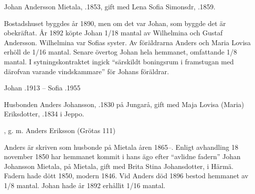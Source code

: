 Johan Andersson Mietala, .1853, gift med Lena Sofia Simonsdr, .1859.
\begin{jhchildren}
  \item {}
  \item {}
  \item {}
  \item {}
  \item {}
  \item {}
  \item {}
  \item {}
\end{jhchildren}
Bostadshuset byggdes år 1890, men om det var Johan, som byggde det är obekräftat. År 1892 köpte Johan 1/18 mantal av Wilhelmina och Gustaf Andersson. Wilhelmina var Sofias syster. Av föräldrarna Anders och Maria Lovisa erhöll de 1/16 mantal. Senare övertog Johan hela hemmanet, omfattande 1/8 mantal. I sytningskontraktet ingick ``särskildt boningsrum i framstugan med därofvan varande vindskammare'' för Johans föräldrar.

Johan .1913  --  Sofia .1955


Husbonden Anders Johansson,  .1830 på Jungarå, gift med Maja Lovisa (Maria) Eriksdotter, .1834 i Jeppo.
\begin{jhchildren}
  \item {}
  \item {}
  \item {}
  \item {}
  \item {}
  \item {}, g. m. Anders Eriksson (Grötas 111)
  \item {}
\end{jhchildren}
Anders är skriven som husbonde på Mietala åren 1865--. Enligt avhandling 18 november 1850 har hemmanet kommit i hans ägo efter	``avlidne fadern'' Johan Johansson Mietala,  på Mietala, gift med Brita Stina Johansdotter,  i Härmä. Fadern hade dött 1850, modern 1846.	Vid Anders död 1896 bestod hemmanet av 1/8 mantal. Johan hade år 1892 erhållit 1/16 mantal.

